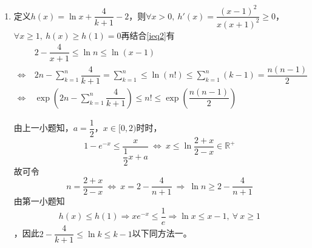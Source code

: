 \begin{enumerate}
	因此$\forall\ 0\leqslant a\leqslant \dfrac{1}{2}$，$g(x)\geqslant f(x)$，充分性得证。综上，$\res{a\in\left[0,\dfrac{1}{2}\right]}$。
	\item {}定义$h(x)=\ln x+\dfrac{4}{k+1}-2$，则$\forall x>0,\ h'(x)=\dfrac{(x-1)^2}{x(x+1)^2}\geqslant 0 $，$\forall x\geqslant 1,\ h(x)\geqslant h(1)=0$再结合\ref{ieq2}有$$\begin{aligned}&2-\dfrac{4}{x+1}\leqslant \ln n\leqslant \ln (x-1)\\\Leftrightarrow\ &2n-\sum_{k=1}^n\dfrac{4}{k+1}=\sum_{k=1}^n\leqslant \ln (n!)\leqslant\sum_{k=1}^n(k-1)=\dfrac{n(n-1)}{2}\\\Leftrightarrow\ &\exp\left(2n-\sum_{k=1}^n\dfrac{4}{k+1}\right)\leqslant n!\leqslant\exp\left(\dfrac{n(n-1)}{2}\right)\end{aligned}$$\par
	由上一小题知，$a=\dfrac{1}{2}$，$x\in[0,2)$时时，$$1-e^{-x}\leqslant \dfrac{x}{\dfrac{1}{2}x+a}\ \Leftrightarrow\ x\leqslant\ln\dfrac{2+x}{2-x}\in\mathbb{R}^+$$故可令$$n=\dfrac{2+x}{2-x}\ \Leftrightarrow\ x=2-\dfrac{4}{n+1}\ \Rightarrow\ \ln n\geqslant 2-\dfrac{4}{n+1}$$由第一小题知$$h(x)\leqslant h(1)\Rightarrow xe^{-x}\leqslant\dfrac{1}{e}\Rightarrow \ln x\leqslant x-1,\ \forall\ x\geqslant1$$，因此$2-\dfrac{4}{k+1}\leqslant \ln k\leqslant k-1$以下同方法一。
\end{enumerate}\par\hfill{}\normal

